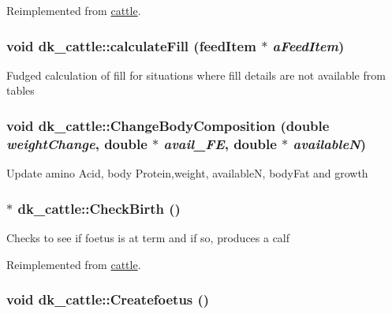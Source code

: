 Reimplemented from \hyperlink{classcattle_a684a6bc701b487ecb37887a81c72f52e}{cattle}.\hypertarget{classdk__cattle_a8e9fc5cc85f1bb6080fbf20bb7586c40}{
\subsubsection[{calculateFill}]{\setlength{\rightskip}{0pt plus 5cm}void dk\_\-cattle::calculateFill ({\bf feedItem} $\ast$ {\em aFeedItem})}}
\label{classdk__cattle_a8e9fc5cc85f1bb6080fbf20bb7586c40}
Fudged calculation of fill for situations where fill details are not available from tables \hypertarget{classdk__cattle_a35db725cc6cf6fbf73528a1a439f8a0e}{
\subsubsection[{ChangeBodyComposition}]{\setlength{\rightskip}{0pt plus 5cm}void dk\_\-cattle::ChangeBodyComposition (double {\em weightChange}, \/  double $\ast$ {\em avail\_\-FE}, \/  double $\ast$ {\em availableN})}}
\label{classdk__cattle_a35db725cc6cf6fbf73528a1a439f8a0e}
Update amino Acid, body Protein,weight, availableN, bodyFat and growth \hypertarget{classdk__cattle_af4ba40d77f7e6e452b022554793a5fd9}{
\subsubsection[{CheckBirth}]{ $\ast$ dk\_\-cattle::CheckBirth ()}}
\label{classdk__cattle_af4ba40d77f7e6e452b022554793a5fd9}
Checks to see if foetus is at term and if so, produces a calf 

Reimplemented from \hyperlink{classcattle_a0f0686111d6eb6ba5dec8b3b92cecb76}{cattle}.\hypertarget{classdk__cattle_ab5538cedcf88ec9337c48fe35eaf75aa}{
\subsubsection[{Createfoetus}]{\setlength{\rightskip}{0pt plus 5cm}void dk\_\-cattle::Createfoetus ()}}
\label{classdk__cattle_ab5538cedcf88ec9337c48fe35eaf75aa}



